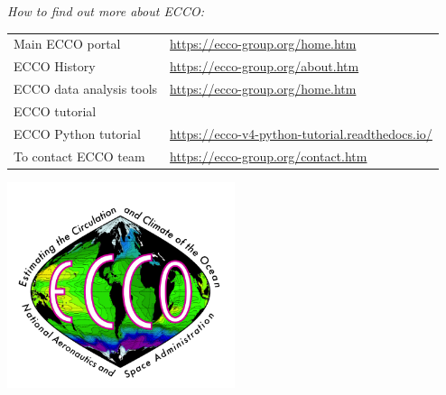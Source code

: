 \pagebreak 
\centering
\emph{\color{MidnightBlue} \Huge How to find out more about ECCO:}
\newp



\color{MidnightBlue}{A complete description of ECCO V4r4 together with all project documentation can be found at the
following web spaces:}
\par
\begin{longtable}{p{} p{}}

Main ECCO portal & \url{https://ecco-group.org/home.htm} \\
ECCO History & \url{https://ecco-group.org/about.htm} \\
ECCO data analysis tools & \url{https://ecco-group.org/home.htm} \\
ECCO tutorial & \color{blue}{\url{http://ghrsst.nodc.noaa.gov}} \\
ECCO Python tutorial & \url{https://ecco-v4-python-tutorial.readthedocs.io/} \\
To contact ECCO team & \url{https://ecco-group.org/contact.htm}\\
\end{longtable}

\includegraphics[width=0.5\textwidth]{../images/ecco_logo_800_726.png}



